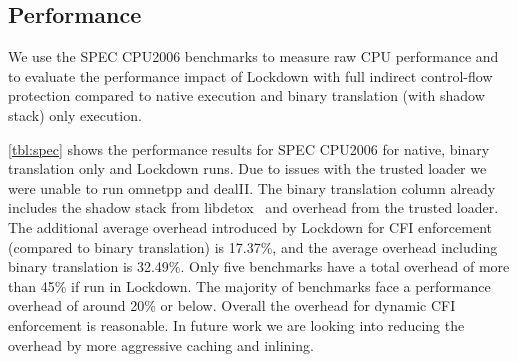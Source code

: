 \documentclass{acm_proc_article-sp}
\begin{document}
\subsection{Performance}


We use the SPEC CPU2006 benchmarks to measure raw CPU performance and to
evaluate the performance impact of Lockdown with full indirect control-flow
protection compared to native execution and binary translation (with shadow
stack) only execution.

\autoref{tbl:spec} shows the performance results for SPEC CPU2006 for
native, binary translation only and Lockdown runs. Due to issues with the
trusted loader we were unable to run omnetpp and dealII. The binary translation column
already includes the shadow stack from libdetox~\cite{libdetox} and overhead
from the trusted loader. The additional
average overhead introduced by Lockdown for CFI enforcement (compared to binary
translation) is 17.37\%, and the average overhead including binary translation is
32.49\%. Only five benchmarks have a total overhead of more than 45\% if run in
Lockdown. The majority of benchmarks face a performance overhead of around 20\%
or below. Overall the overhead for dynamic CFI enforcement is reasonable. In
future work we are looking into reducing the overhead by more aggressive caching
and inlining.
\end{document}
